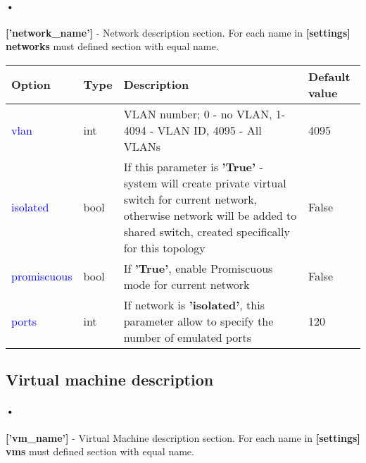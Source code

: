 \documentclass[a4paper,11pt]{article}
\def \frst {2.8cm} %
\def \scnd {1.2cm} %
\def \thrd {8cm}
\def \frth {3cm}
\def \tnamefsrt{\textbf{Option}}
\def \tnamescnd{\textbf{Type}}
\def \tnamethrd{\textbf{Description}}
\def \tnamefrth{\textbf{Default value}}
\let\oldsubsection\subsection
\def\subsection{\subsectionclearpage\let\subsectionclearpage\clearpage\oldsubsection}
\begin{document}
\paragraph{•}
\textbf{['network\_name']} - Network description section. For each name in \textbf{[settings] networks} must defined section with equal name.\\

\begin{tabular}{p{\frst}|p{\scnd}|p{\thrd}|p{\frth}}
\tnamefsrt 		   		   & \tnamescnd   & \tnamethrd           & \tnamefrth 			\\
\hline
\textcolor{blue}{vlan}        & int  & VLAN number; 0 - no VLAN, 1-4094 - VLAN ID, 4095 - All VLANs                                                                                                                               & 4095                    \\
\textcolor{blue}{isolated}    & bool & If this parameter is \textbf{'True'} - system will create private virtual switch for current network, otherwise network will be added to shared switch, created specifically for this topology & False                   \\
\textcolor{blue}{promiscuous} & bool & If \textbf{'True'}, enable Promiscuous mode for current network                                                                                                                                       & False                   \\
\textcolor{blue}{ports}       & int  & If network is \textbf{'isolated'}, this parameter allow to specify the number of emulated ports                                                                                                   & 120                     \\
\end{tabular}

\subsection{Virtual machine description}
\paragraph{•}
\textbf{['vm\_name']} - Virtual Machine description section. For each name in \textbf{[settings] vms} must defined section with equal name.\\
\end{document}
